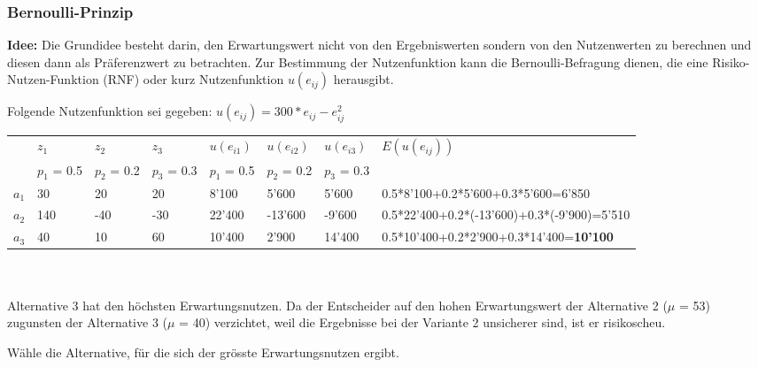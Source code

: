 \subsubsection{Bernoulli-Prinzip}
\textbf{Idee:} Die Grundidee besteht darin, den Erwartungswert nicht von den Ergebniswerten sondern von den Nutzenwerten zu berechnen und diesen dann als Präferenzwert zu betrachten. Zur Bestimmung der Nutzenfunktion kann die Bernoulli-Befragung
dienen, die eine Risiko-Nutzen-Funktion (RNF) oder kurz Nutzenfunktion $u(e_{ij})$ herausgibt.
\begin{example}
	Folgende Nutzenfunktion sei gegeben: $u(e_{ij}) = 300 * e_{ij} - e_{ij}^2$ \\
	\begin{tabular}{|l|l|l|l||l|l|l||l|}
		\hline
		& $z_1$ & $z_2$ & $z_3$ & $u(e_{i1})$ & $u(e_{i2})$ & $u(e_{i3})$ & $E(u(e_{ij}))$ \\
		& $p_1$ = 0.5 & $p_2$ = 0.2 & $p_3$ = 0.3 & $p_1$ = 0.5 & $p_2$ = 0.2 & $p_3$ = 0.3 & \\ \hline
		$a_1$ & 30 & 20 & 20 & 8'100 & 5'600 & 5'600 & 0.5*8'100+0.2*5'600+0.3*5'600=6'850\\ \hline
		$a_2$ & 140 & -40 & -30 & 22'400 & -13'600 & -9'600 & 0.5*22'400+0.2*(-13'600)+0.3*(-9'900)=5'510\\ \hline
		$a_3$ & 40 & 10 & 60 & 10'400 & 2'900 & 14'400 & 0.5*10'400+0.2*2'900+0.3*14'400=\textbf{10'100}\\ \hline
	\end{tabular} \\ \ \\
	Alternative 3 hat den höchsten Erwartungsnutzen. Da der Entscheider auf den hohen Erwartungswert der Alternative 2 ($\mu$  = 53) zugunsten der Alternative 3 ($\mu$ = 40) verzichtet, weil die Ergebnisse bei der Variante 2 unsicherer sind, ist er risikoscheu.
\end{example}
Wähle die Alternative, für die sich der grösste Erwartungsnutzen ergibt.